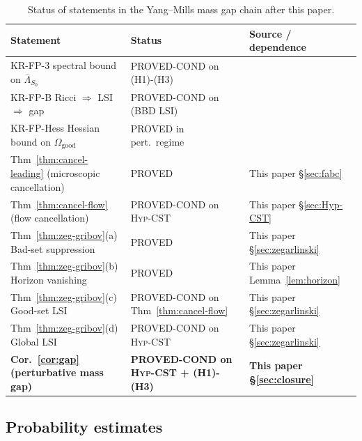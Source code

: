 \documentclass[11pt,a4paper]{amsart}
\theoremstyle{definition}
\begin{document}
\begin{table}[h]
\centering
\small
\begin{tabular}{p{}|p{}|p{}}
\toprule
\textbf{Statement} & \textbf{Status} & \textbf{Source / dependence} \\
\midrule
KR-FP-3 spectral bound on $\overline\Lambda_{S_0}$ & PROVED-COND on (H1)-(H3) & \cite{RemondiereKRFP3_2026} \\
KR-FP-B Ricci $\Rightarrow$ LSI $\Rightarrow$ gap & PROVED-COND on (BBD LSI) & \cite{RemondiereKRFPBakryEmery_2026} \\
KR-FP-Hess Hessian bound on $\Omega_{\mathrm{good}}$ & PROVED in pert.\ regime & \cite{RemondiereFPHess_2026} \\
Thm~\ref{thm:cancel-leading} (microscopic cancellation) & PROVED & This paper \S\ref{sec:fabc} \\
Thm~\ref{thm:cancel-flow} (flow cancellation) & PROVED-COND on \textsc{Hyp-CST} & This paper \S\ref{sec:Hyp-CST} \\
Thm~\ref{thm:zeg-gribov}(a) Bad-set suppression & PROVED & This paper \S\ref{sec:zegarlinski} \\
Thm~\ref{thm:zeg-gribov}(b) Horizon vanishing & PROVED & This paper Lemma~\ref{lem:horizon} \\
Thm~\ref{thm:zeg-gribov}(c) Good-set LSI & PROVED-COND on Thm~\ref{thm:cancel-flow} & This paper \S\ref{sec:zegarlinski} \\
Thm~\ref{thm:zeg-gribov}(d) Global LSI & PROVED-COND on \textsc{Hyp-CST} & This paper \S\ref{sec:zegarlinski} \\
\midrule
\textbf{Cor.~\ref{cor:gap} (perturbative mass gap)} & \textbf{PROVED-COND on \textsc{Hyp-CST} + (H1)-(H3)} & \textbf{This paper \S\ref{sec:closure}} \\
\bottomrule
\end{tabular}
\caption{Status of statements in the Yang--Mills mass gap chain after this paper.}
\end{table}

\subsection{Probability estimates}
\end{document}
